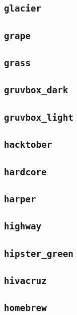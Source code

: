 \subsection{\texttt{glacier}}
\newpage
\subsection{\texttt{grape}}
\newpage
\subsection{\texttt{grass}}
\newpage
\subsection{\texttt{gruvbox\_dark}}
\newpage
\subsection{\texttt{gruvbox\_light}}
\newpage
\subsection{\texttt{hacktober}}
\newpage
\subsection{\texttt{hardcore}}
\newpage
\subsection{\texttt{harper}}
\newpage
\subsection{\texttt{highway}}
\newpage
\subsection{\texttt{hipster\_green}}
\newpage
\subsection{\texttt{hivacruz}}
\newpage
\subsection{\texttt{homebrew}}
\newpage
